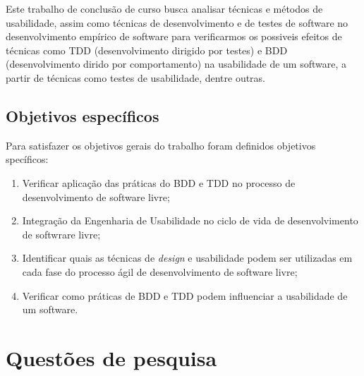 Este trabalho de conclusão de curso busca analisar técnicas e métodos de usabilidade, assim como técnicas de desenvolvimento e de testes de software no desenvolvimento empírico de software para verificarmos os possiveis efeitos de técnicas como TDD (desenvolvimento dirigido por testes) e BDD (desenvolvimento dirido por comportamento) na usabilidade de um software, a partir de técnicas como testes de usabilidade, dentre outras.
	 
	 
\subsection{Objetivos específicos}

Para satisfazer os objetivos gerais do trabalho foram definidos objetivos specíficos:

\begin{enumerate}
\item Verificar aplicação das práticas do BDD e TDD no processo de desenvolvimento de software livre;
\item Integração da Engenharia de Usabilidade no ciclo de vida de desenvolvimento de softwrare livre;
\item Identificar quais as técnicas de \emph{design} e usabilidade  podem ser utilizadas em cada fase do processo ágil de desenvolvimento de software livre;
\item Verificar como práticas de BDD e TDD podem influenciar a usabilidade de um software.



\end{enumerate}

\section{Questões de pesquisa}

